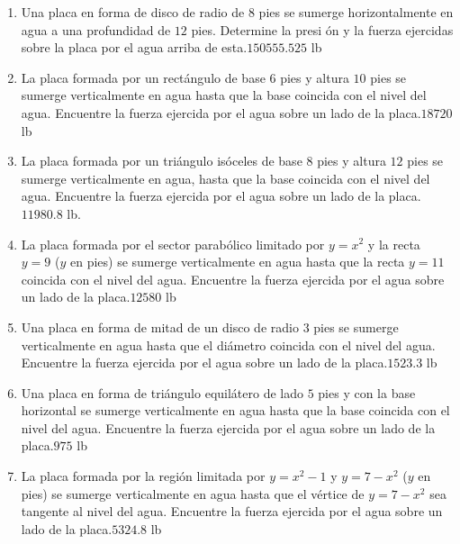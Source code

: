 {\begin{enumerate}
\item {Una placa en forma de disco de radio de $8$ pies se sumerge
horizontalmente en agua a una profundidad de $12$ pies. Determine la presi%
ón y la fuerza ejercidas sobre la placa por el agua arriba de esta.}{$150555.525$ lb}



\item {La placa formada por un rectángulo de base $6$ pies y altura $10$ pies se sumerge verticalmente en agua hasta que la base coincida con el nivel del
agua. Encuentre la fuerza ejercida por el agua sobre un lado de la placa.}{$18720$ lb}



\item {La placa formada por un triángulo isóceles de base $8$ pies y
altura $12$ pies se sumerge verticalmente en agua, hasta que la base coincida
con el nivel del agua. Encuentre la fuerza ejercida por el agua sobre un
lado de la placa.}{$11980.8$ lb.}



\item {La placa formada por el sector parabólico limitado por $y=x^{2}$ y la
recta $y=9$ ($y$ en pies) se sumerge verticalmente en agua hasta que la
recta $y=11$ coincida con el nivel del agua. Encuentre la fuerza ejercida por
el agua sobre un lado de la placa.}{$12580$ lb}



\item {Una placa en forma de mitad de un disco de radio $3$ pies se sumerge
verticalmente en agua hasta que el diámetro coincida con el nivel del agua.
Encuentre la fuerza ejercida por el agua sobre un lado de la placa.}{$1523.3$ lb}



\item {Una placa en forma de triángulo equilátero de lado $5$ pies y con la base horizontal se sumerge verticalmente en agua hasta que la base coincida con
el nivel del agua. Encuentre la fuerza ejercida por el agua sobre un lado de
la placa.}{$975$ lb}



\item {La placa formada por la región limitada por $y=x^{2}-1$ y $y=7-x^{2}$
($y$ en pies) se sumerge verticalmente en agua hasta que el vértice de $%
y=7-x^{2}$ sea tangente al nivel del agua. Encuentre la fuerza ejercida por
el agua sobre un lado de la placa.}{$5324.8$ lb}




\end{enumerate}}
